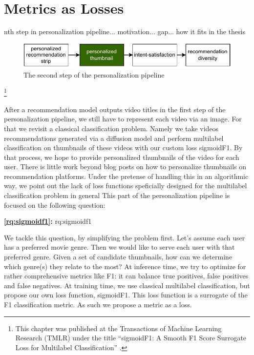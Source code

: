 
\chapter{Metrics as Losses}
\label{chapter:research-sigmoidf1}

nth step in personalization pipeline...
motivation...
gap...
how it fits in the thesis
\fi

\begin{figure}[ht]
  \centering
  \includegraphics{images/pipeline_step2.pdf}
  \caption{The second step of the personalization pipeline}
  \label{fig:pip2}
\end{figure}

\footnote[]{This chapter was published at the Transactions of Machine Learning Research (TMLR) under the title ``sigmoidF1: A Smooth F1 Score Surrogate Loss for Multilabel Classification'' \citep{sigmoidf1}.}
\acresetall

After a recommendation model outputs video titles in the first step of the personalization pipeline, we still have to represent each video via an image. For that we revisit a classical classification problem. Namely we take videos recommendations generated via a diffusion model and perform multilabel classification on thumbnails of these videos with our custom loss sigmoidF1. By that process, we hope to provide personalized thumbnails of the video for each user. There is little work beyond blog posts on how to personalize thumbnails on recommendation platforms. Under the pretense of handling this in an algorithmic way, we point out the lack of loss functions speficially designed for the multilabel classification problem in general
This part of the personalization pipeline is focused on the following question:

\medskip
\noindent
\textbf{\ref{rq:sigmoidf1}:} \acl{rq:sigmoidf1}
\medskip

We tackle this question, by simplifying the problem first. Let's assume each user has a preferred movie genre. Then we would like to serve each user with that preferred genre. Given a set of candidate thumbnails, how can we determine which genre(s) they relate to the most? At inference time, we try to optimize for rather comprehensive metrics like F1: it can balance true positives, false positives and false negatives. At training time, we use classical multilabel classification, but propose our own loss function, sigmoidF1. This loss function is a surrogate of the F1 classification metric. As such we propose a metric as a loss.




